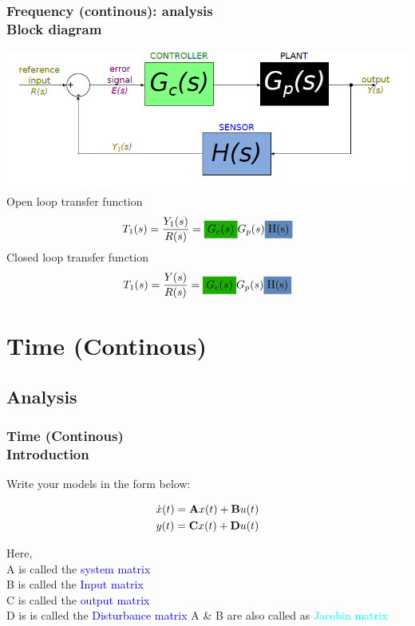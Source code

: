 \documentclass[hyperref={pdfpagelabels=true}]{beamer}
\begin{document}
\begin{frame}
\frametitle{Frequency (continous): analysis \\ {\large Block diagram}}
\includegraphics[scale = .38]{figs/Selection_047.PNG}  \\
Open loop transfer function
\begin{align*}
T_1(s)=\frac{Y_1(s)}{R(s)}=\colorbox{mygreen}{$G_c(s)$}G_p(s)\colorbox{mygree}{H(s)}
\end{align*}
Closed loop transfer function
\begin{align*}
T_1(s)=\frac{Y(s)}{R(s)}=\colorbox{mygreen}{$G_c(s)$}G_p(s)\colorbox{mygree}{H(s)}
\end{align*}
\end{frame}

\section{Time (Continous)}
\subsection{Analysis}
\begin{frame}
\frametitle{Time (Continous) \\ {\large Introduction}}
Write your models in the form below:
\begin{tcolorbox}[title=  ,width=9.85 cm]
\begin{align*}
\dot{x}(t)={\bf A}x(t) + {\bf B}u(t) \\
y(t)={\bf C}x(t) + {\bf D}u(t)
\end{align*}
\end{tcolorbox}
Here,\\ 
A is called the \textcolor{blue}{system matrix} \\
B is called the \textcolor{blue}{Input matrix}\\
C is called the \textcolor{blue}{output matrix}\\
D is is called the \textcolor{blue}{Disturbance matrix}
\vfill
A \& B are also called as \textcolor{cyan}{Jacobin matrix}
\end{frame}
\end{document}
